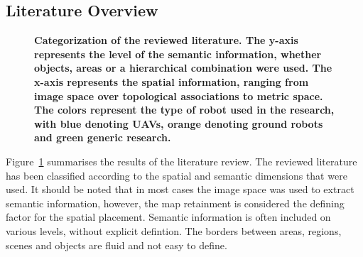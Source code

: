 \documentclass[twocolumn,letterpaper]{IEEEAerospaceCLS}  %
\begin{document}
\subsection{Literature Overview} \label{ssec:ResLit}
\begin{figure}
    \centering
    \caption{\bf{
        Categorization of the reviewed literature. The y-axis represents the level of the semantic information, whether objects, areas or a hierarchical combination were used. The x-axis represents the spatial information, ranging from image space over topological associations to metric space. The colors represent the type of robot used in the research, with blue denoting UAVs, orange denoting ground robots and green generic research.
    }}
    \label{fig:LitRes}
\end{figure}
Figure~\ref{fig:LitRes} summarises the results of the literature review. The reviewed literature has been classified according to the spatial and semantic dimensions that were used. It should be noted that in most cases the image space was used to extract semantic information, however, the map retainment is considered the defining factor for the spatial placement. Semantic information is often included on various levels, without explicit defintion. The borders between areas, regions, scenes and objects are fluid and not easy to define.
\end{document}
